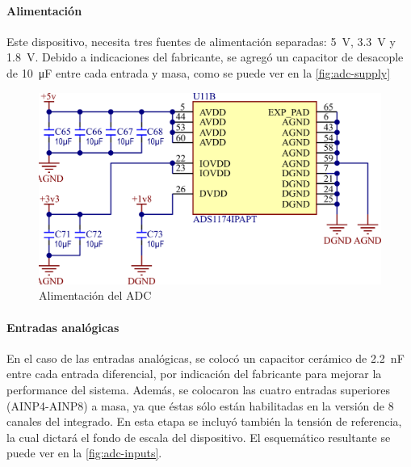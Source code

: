 \documentclass[titlepage, 12pt]{article}
\begin{document}
\paragraph{Alimentación}
Este dispositivo, necesita tres fuentes de alimentación separadas: \SI{5}{V}, \SI{3.3}{V} y \SI{1.8}{V}. Debido a indicaciones del fabricante, se agregó un capacitor de desacople de \SI{10}{\micro F} entre cada entrada y masa, como se puede ver en la \autoref{fig:adc-supply}

    \begin{figure}[!htbp]
        \centering
        \includegraphics[scale=1.5]{images/adc-supply.png}
        \caption{Alimentación del ADC}
        \label{fig:adc-supply}
    \end{figure}

\paragraph{Entradas analógicas}
En el caso de las entradas analógicas, se colocó un capacitor cerámico de \SI{2.2}{nF} entre cada entrada diferencial, por indicación del fabricante para mejorar la performance del sistema. Además, se colocaron las cuatro entradas superiores (AINP4-AINP8) a masa, ya que éstas sólo están habilitadas en la versión de 8 canales del integrado. En esta etapa se incluyó también la tensión de referencia, la cual dictará el fondo de escala del dispositivo. El esquemático resultante se puede ver en la \autoref{fig:adc-inputs}.
\end{document}

